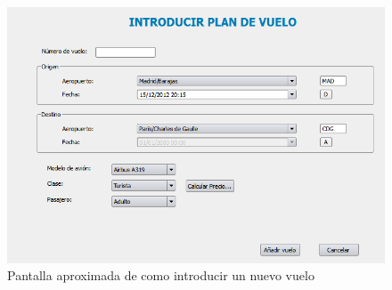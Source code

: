 \begin{figure}[ht]\centering
\includegraphics[scale=.6]{imagenes/introducirPlanDeVueloImagen.png}
\caption{Pantalla aproximada de como introducir un nuevo vuelo}
\end{figure}
